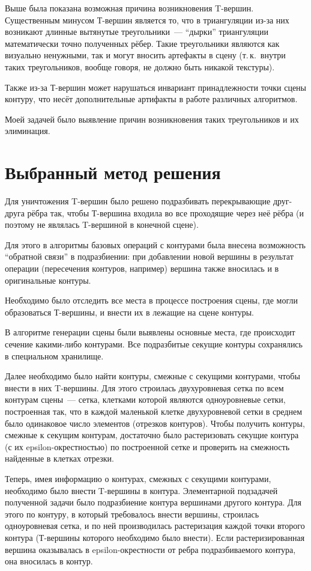 \documentclass[a4paper,12pt,titlepage]{report}
\begin{document}
Выше была показана возможная причина возникновения T-вершин.
Существенным минусом Т-вершин является то, 
что в триангуляции из-за них возникают длинные вытянутые треугольники~--- 
``дырки'' триангуляции математически точно полученных рёбер.
Такие треугольники являются как визуально ненужными, 
так и могут вносить артефакты в сцену
(т.\,к.~внутри таких треугольников, вообще говоря, не должно быть никакой текстуры).

Также из-за Т-вершин может нарушаться инвариант принадлежности точки сцены контуру,
что несёт дополнительные артифакты в работе различных алгоритмов.

Моей задачей было выявление причин возникновения таких треугольников и их элиминация.

\section*{Выбранный метод решения}
Для уничтожения T-вершин было решено подразбивать перекрывающие друг-друга рёбра так, 
чтобы Т-вершина входила во все проходящие через неё рёбра 
(и поэтому не являлась T-вершиной в конечной сцене).

Для этого в алгоритмы базовых операций с контурами была внесена возможность ``обратной связи'' в подразбиении: 
при добавлении новой вершины в результат операции (пересечения контуров, например)
вершина также вносилась и в оригинальные контуры.

Необходимо было отследить все места в процессе построения сцены, 
где могли образоваться Т-вершины, и внести их в лежащие на сцене контуры.

В алгоритме генерации сцены были выявлены основные места, 
где происходит сечение какими-либо контурами.
Все подразбитые секущие контуры сохранялись в специальном хранилище.

Далее необходимо было найти контуры, смежные с секущими контурами, 
чтобы внести в них T-вершины.
Для этого строилась двухуровневая сетка по всем контурам сцены~---
сетка, клетками которой являются одноуровневые сетки, построенная так, 
что в каждой маленькой клетке двухуровневой сетки в среднем было одинаковое число элементов 
(отрезков контуров).
Чтобы получить контуры, смежные к секущим контурам, достаточно было растеризовать секущие 
контура (с их epsilon-окрестностью) по построенной сетке и проверить на смежность 
найденные в клетках отрезки.

Теперь, имея информацию о контурах, смежных с секущими контурами, 
необходимо было внести T-вершины в контура.
Элементарной подзадачей полученной задачи было подразбиение контура вершинами другого контура.
Для этого по контуру, в который требовалось внести вершины, строилась одноуровневая сетка, 
и по ней производилась растеризация каждой точки второго контура (Т-вершины которого необходимо было внести). 
Если растеризированная вершина оказывалась в epsilon-окрестности от ребра подразбиваемого контура, 
она вносилась в контур.
\end{document}
